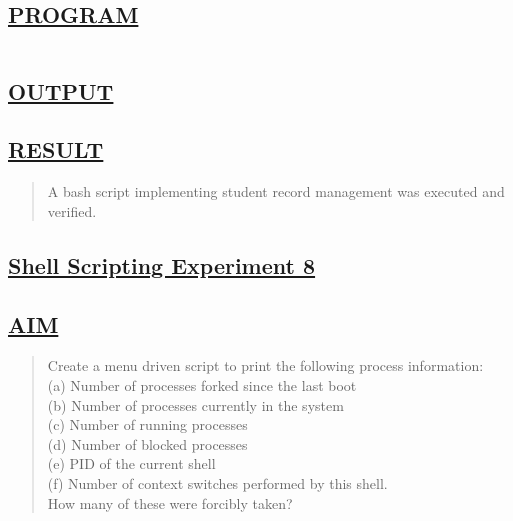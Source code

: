 \documentclass[a4paper, 12pt]{article}
\begin{document}
\subsection*{\underline{PROGRAM}}
\begin{quote}
\inputminted[fontsize=\small,breaklines,breakanywhere]{sh}{shell1.sh}%
\end{quote}

\newpage

\subsection*{\underline{OUTPUT}}

\begin{figure}[H] 
    \centering
\end{figure}


\subsection*{\underline{RESULT}}
\begin{quote}
A bash script implementing student record management was executed and verified.
\end{quote}

\newpage
\begin{center}
\section*{\LARGE \textbf{\underline{Shell Scripting Experiment 8}}} %
\end{center}

\subsection*{\underline{AIM}}
\begin{quote}
Create a menu driven script to print the following process information:\\
(a) Number of processes forked since the last boot\\
(b) Number of processes currently in the system\\
(c) Number of running processes\\
(d) Number of blocked processes\\
(e) PID of the current shell\\
(f) Number of context switches performed by this shell.\\
How many of these were forcibly taken?
\end{quote}
\end{document}
